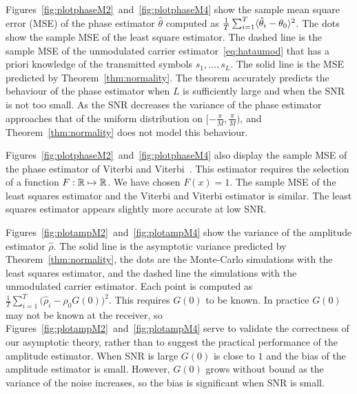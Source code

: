 \documentclass{article}
\begin{document}
Figures~\ref{fig:plotphaseM2}~and~\ref{fig:plotphaseM4} show the sample mean square error (MSE) of the phase estimator $\hat{\theta}$ computed as $\tfrac{1}{T}\sum_{i=1}^T\langle \hat{\theta}_i - \theta_0 \rangle^2$.  The dots show the sample MSE of the least square estimator.  The dashed line is the sample MSE of the unmodulated carrier estimator~\eqref{eq:hataumod} that has a priori knowledge of the transmitted symbols $s_1, \dots, s_L$.  %
The solid line is the MSE predicted by Theorem~\ref{thm:normality}.  The theorem accurately predicts the behaviour of the phase estimator when $L$ is sufficiently large and when the SNR is not too small.  As the SNR decreases the variance of the phase estimator approaches that of the uniform distribution on $[-\tfrac{\pi}{M}, \tfrac{\pi}{M})$, and Theorem~\ref{thm:normality} does not model this behaviour.  %

Figures~\ref{fig:plotphaseM2}~and~\ref{fig:plotphaseM4} also display the sample MSE of the phase estimator of Viterbi and Viterbi~\cite{ViterbiViterbi_phase_est_1983}.  This estimator requires the selection of a function $F : {\mathbb R} \mapsto {\mathbb R}$.  We have chosen $F(x) = 1$.  The sample MSE of the least squares estimator and the Viterbi and Viterbi estimator is similar.  The least squares estimator appears slightly more accurate at low SNR.


Figures~\ref{fig:plotampM2}~and~\ref{fig:plotampM4} show the variance of the amplitude estimator $\hat{\rho}$.   The solid line is the asymptotic variance predicted by Theorem~\ref{thm:normality}, the dots are the Monte-Carlo simulations with the least squares estimator, and the dashed line the simulations with the unmodulated carrier estimator.  Each point is computed as $\tfrac{1}{T}\sum_{i=1}^T\big(\hat{\rho}_i - \rho_0G(0)\big)^2$.  This requires $G(0)$ to be known.  In practice $G(0)$ may not be known at the receiver, so Figures~\ref{fig:plotampM2}~and~\ref{fig:plotampM4} serve to validate the correctness of our asymptotic theory, rather than to suggest the practical performance of the amplitude estimator.  When SNR is large $G(0)$ is close to $1$ and the bias of the amplitude estimator is small.  However, $G(0)$ grows without bound as the variance of the noise increases, so the bias is significant when SNR is small.


\end{document}
